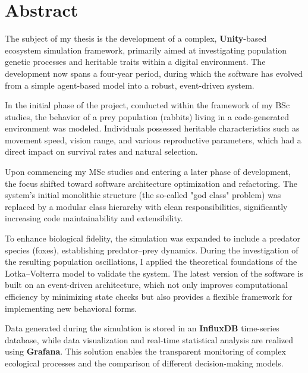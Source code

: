 \selectenglish
\chapter*{Abstract}

\noindent The subject of my thesis is the development of a complex, \textbf{Unity}-based ecosystem simulation framework, primarily aimed at investigating population genetic processes and heritable traits within a digital environment. The development now spans a four-year period, during which the software has evolved from a simple agent-based model into a robust, event-driven system.

In the initial phase of the project, conducted within the framework of my BSc studies, the behavior of a prey population (rabbits) living in a code-generated environment was modeled. Individuals possessed heritable characteristics such as movement speed, vision range, and various reproductive parameters, which had a direct impact on survival rates and natural selection.

Upon commencing my MSc studies and entering a later phase of development, the focus shifted toward software architecture optimization and refactoring. The system's initial monolithic structure (the so-called "god class" problem) was replaced by a modular class hierarchy with clean responsibilities, significantly increasing code maintainability and extensibility.

To enhance biological fidelity, the simulation was expanded to include a predator species (foxes), establishing predator–prey dynamics. During the investigation of the resulting population oscillations, I applied the theoretical foundations of the Lotka–Volterra model to validate the system. The latest version of the software is built on an event-driven architecture, which not only improves computational efficiency by minimizing state checks but also provides a flexible framework for implementing new behavioral forms.

Data generated during the simulation is stored in an \textbf{InfluxDB} time-series database, while data visualization and real-time statistical analysis are realized using \textbf{Grafana}. This solution enables the transparent monitoring of complex ecological processes and the comparison of different decision-making models.
\vfill
\selectthesislanguage

\setcounter{romanPage}{\value{page}}
